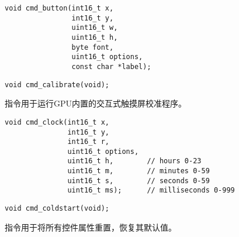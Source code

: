 
\begin{framed}
\begin{verbatim}
void cmd_button(int16_t x,
                int16_t y,
                uint16_t w,
                uint16_t h,
                byte font,
                uint16_t options,
                const char *label);
\end{verbatim}
\end{framed}



\begin{framed}
\begin{verbatim}
void cmd_calibrate(void);
\end{verbatim}
\end{framed}

 指令用于运行GPU内置的交互式触摸屏校准程序。



\begin{framed}
\begin{verbatim}
void cmd_clock(int16_t x,
               int16_t y,
               int16_t r,
               uint16_t options,
               uint16_t h,        // hours 0-23
               uint16_t m,        // minutes 0-59
               uint16_t s,        // seconds 0-59
               uint16_t ms);      // milliseconds 0-999
\end{verbatim}
\end{framed}



\begin{framed}
\begin{verbatim}
void cmd_coldstart(void);
\end{verbatim}
\end{framed}

 指令用于将所有控件属性重置，恢复其默认值。


